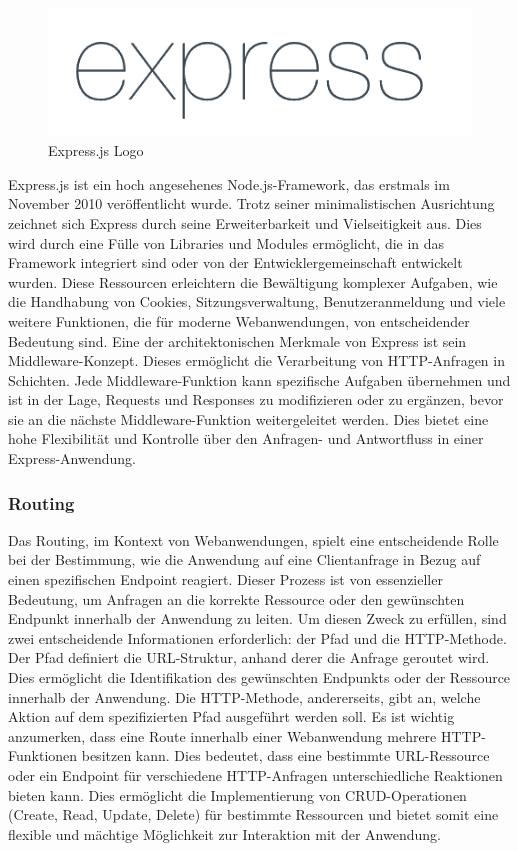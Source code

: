 \begin{figure}
    \centering
    \includegraphics[width=0.8\linewidth]{pics/express_logo.png}
    \caption{Express.js Logo}
    \label{fig:enter-label}
\end{figure}
Express.js ist ein hoch angesehenes Node.js-Framework, das erstmals im November 2010 veröffentlicht wurde. Trotz seiner minimalistischen Ausrichtung zeichnet sich Express durch seine Erweiterbarkeit und Vielseitigkeit aus. Dies wird durch eine Fülle von Libraries und Modules ermöglicht, die in das Framework integriert sind oder von der Entwicklergemeinschaft entwickelt wurden. Diese Ressourcen erleichtern die Bewältigung komplexer Aufgaben, wie die Handhabung von Cookies, Sitzungsverwaltung, Benutzeranmeldung und viele weitere Funktionen, die für moderne Webanwendungen, von entscheidender Bedeutung sind.
\newline
Eine der architektonischen Merkmale von Express ist sein Middleware-Konzept. Dieses ermöglicht die Verarbeitung von HTTP-Anfragen in Schichten. Jede Middleware-Funktion kann spezifische Aufgaben übernehmen und ist in der Lage, Requests und Responses zu modifizieren oder zu ergänzen, bevor sie an die nächste Middleware-Funktion weitergeleitet werden. Dies bietet eine hohe Flexibilität und Kontrolle über den Anfragen- und Antwortfluss in einer Express-Anwendung.
\cite{Express_js_Introduction}

\subsubsection{Routing}
Das Routing, im Kontext von Webanwendungen, spielt eine entscheidende Rolle bei der Bestimmung, wie die Anwendung auf eine Clientanfrage in Bezug auf einen spezifischen Endpoint reagiert. Dieser Prozess ist von essenzieller Bedeutung, um Anfragen an die korrekte Ressource oder den gewünschten Endpunkt innerhalb der Anwendung zu leiten. Um diesen Zweck zu erfüllen, sind zwei entscheidende Informationen erforderlich: der Pfad und die HTTP-Methode.
\newline
Der Pfad definiert die URL-Struktur, anhand derer die Anfrage geroutet wird. Dies ermöglicht die Identifikation des gewünschten Endpunkts oder der Ressource innerhalb der Anwendung. Die HTTP-Methode, andererseits, gibt an, welche Aktion auf dem spezifizierten Pfad ausgeführt werden soll. Es ist wichtig anzumerken, dass eine Route innerhalb einer Webanwendung mehrere HTTP-Funktionen besitzen kann. Dies bedeutet, dass eine bestimmte URL-Ressource oder ein Endpoint für verschiedene HTTP-Anfragen unterschiedliche Reaktionen bieten kann. Dies ermöglicht die Implementierung von CRUD-Operationen (Create, Read, Update, Delete) für bestimmte Ressourcen und bietet somit eine flexible und mächtige Möglichkeit zur Interaktion mit der Anwendung.
\cite{Express_js_basic_routing}
\cite{Express_js_routing}

